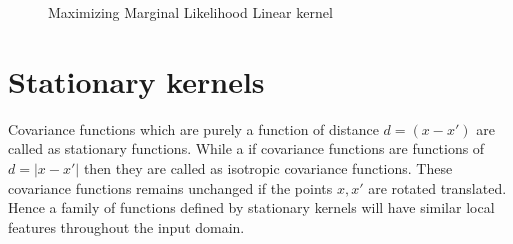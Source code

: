 \begin{figure}[!ht]
  \centering
    \quad
{}\quad

       \caption{Maximizing Marginal Likelihood Linear kernel}
       \label{figMaximizingMLLinearKernel}
\end{figure}


\section{Stationary kernels} \label{secStationaryKernels}
Covariance functions which are purely a function of distance \(d = (x-x')\) are called as stationary functions. While a if covariance functions are functions of \(d = |x-x'|\) then they are called as isotropic covariance functions. These covariance functions remains unchanged if the points \(x, x'\) are rotated translated. Hence a family of functions defined by stationary kernels will have similar local features throughout the input domain. 




